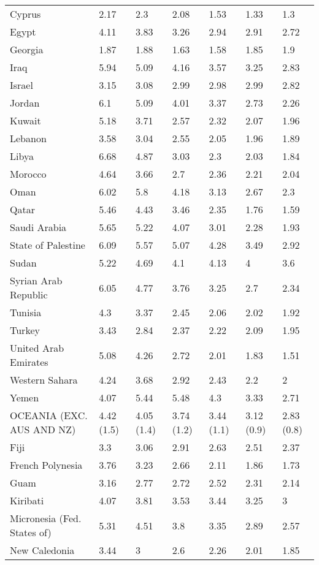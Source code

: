 \begin{longtable}[t]{lllllll}
Cyprus & 2.17 & 2.3 & 2.08 & 1.53 & 1.33 & 1.3\\
Egypt & 4.11 & 3.83 & 3.26 & 2.94 & 2.91 & 2.72\\
Georgia & 1.87 & 1.88 & 1.63 & 1.58 & 1.85 & 1.9\\
Iraq & 5.94 & 5.09 & 4.16 & 3.57 & 3.25 & 2.83\\
Israel & 3.15 & 3.08 & 2.99 & 2.98 & 2.99 & 2.82\\
Jordan & 6.1 & 5.09 & 4.01 & 3.37 & 2.73 & 2.26\\
Kuwait & 5.18 & 3.71 & 2.57 & 2.32 & 2.07 & 1.96\\
Lebanon & 3.58 & 3.04 & 2.55 & 2.05 & 1.96 & 1.89\\
Libya & 6.68 & 4.87 & 3.03 & 2.3 & 2.03 & 1.84\\
Morocco & 4.64 & 3.66 & 2.7 & 2.36 & 2.21 & 2.04\\
Oman & 6.02 & 5.8 & 4.18 & 3.13 & 2.67 & 2.3\\
Qatar & 5.46 & 4.43 & 3.46 & 2.35 & 1.76 & 1.59\\
Saudi Arabia & 5.65 & 5.22 & 4.07 & 3.01 & 2.28 & 1.93\\
State of Palestine & 6.09 & 5.57 & 5.07 & 4.28 & 3.49 & 2.92\\
Sudan & 5.22 & 4.69 & 4.1 & 4.13 & 4 & 3.6\\
Syrian Arab Republic & 6.05 & 4.77 & 3.76 & 3.25 & 2.7 & 2.34\\
Tunisia & 4.3 & 3.37 & 2.45 & 2.06 & 2.02 & 1.92\\
Turkey & 3.43 & 2.84 & 2.37 & 2.22 & 2.09 & 1.95\\
United Arab Emirates & 5.08 & 4.26 & 2.72 & 2.01 & 1.83 & 1.51\\
Western Sahara & 4.24 & 3.68 & 2.92 & 2.43 & 2.2 & 2\\
Yemen & 4.07 & 5.44 & 5.48 & 4.3 & 3.33 & 2.71\\
OCEANIA (EXC. AUS AND NZ) & 4.42 (1.5) & 4.05 (1.4) & 3.74 (1.2) & 3.44 (1.1) & 3.12 (0.9) & 2.83 (0.8)\\
Fiji & 3.3 & 3.06 & 2.91 & 2.63 & 2.51 & 2.37\\
French Polynesia & 3.76 & 3.23 & 2.66 & 2.11 & 1.86 & 1.73\\
Guam & 3.16 & 2.77 & 2.72 & 2.52 & 2.31 & 2.14\\
Kiribati & 4.07 & 3.81 & 3.53 & 3.44 & 3.25 & 3\\
Micronesia (Fed. States of) & 5.31 & 4.51 & 3.8 & 3.35 & 2.89 & 2.57\\
New Caledonia & 3.44 & 3 & 2.6 & 2.26 & 2.01 & 1.85\\

\end{longtable}
